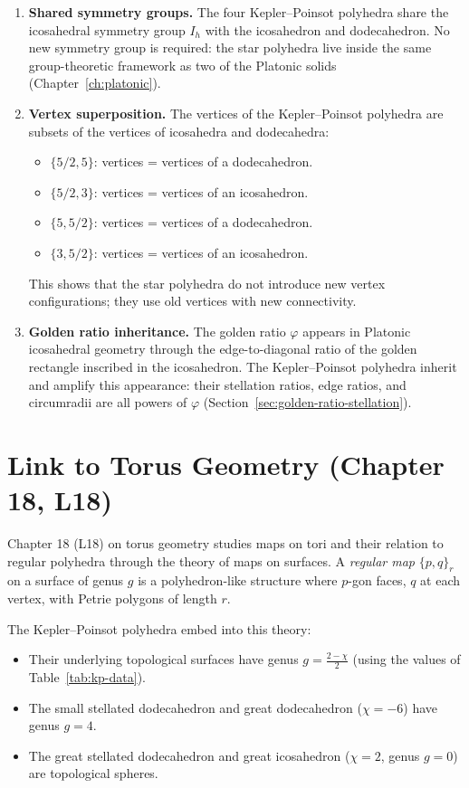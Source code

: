 \begin{enumerate}
\item \textbf{Shared symmetry groups.}  The four Kepler–Poinsot
polyhedra share the icosahedral symmetry group $I_h$ with the
icosahedron and dodecahedron.  No new symmetry group is
required: the star polyhedra live inside the same group-theoretic
framework as two of the Platonic solids
(Chapter~\ref{ch:platonic}).

\item \textbf{Vertex superposition.}  The vertices of the
Kepler–Poinsot polyhedra are subsets of the vertices of
icosahedra and dodecahedra:
  \begin{itemize}
  \item $\{5/2,5\}$: vertices = vertices of a dodecahedron.
  \item $\{5/2,3\}$: vertices = vertices of an icosahedron.
  \item $\{5,5/2\}$: vertices = vertices of a dodecahedron.
  \item $\{3,5/2\}$: vertices = vertices of an icosahedron.
  \end{itemize}
This shows that the star polyhedra do not introduce new vertex
configurations; they use old vertices with new connectivity.

\item \textbf{Golden ratio inheritance.}  The golden ratio
$\varphi$ appears in Platonic icosahedral geometry through
the edge-to-diagonal ratio of the golden rectangle inscribed in
the icosahedron.  The Kepler–Poinsot polyhedra inherit and
amplify this appearance: their stellation ratios, edge ratios,
and circumradii are all powers of $\varphi$
(Section~\ref{sec:golden-ratio-stellation}).
\end{enumerate}

\section{Link to Torus Geometry (Chapter 18, L18)}
\label{sec:link-torus}

Chapter 18 (L18) on torus geometry studies maps on tori and
their relation to regular polyhedra through the theory of maps
on surfaces.  A \emph{regular map} $\{p,q\}_r$ on a surface of
genus $g$ is a polyhedron-like structure where $p$-gon faces,
$q$ at each vertex, with Petrie polygons of length $r$.

The Kepler–Poinsot polyhedra embed into this theory:
\begin{itemize}
  \item Their underlying topological surfaces have genus
        $g = \frac{2-\chi}{2}$ (using the values of
        Table~\ref{tab:kp-data}).
  \item The small stellated dodecahedron and great dodecahedron
        ($\chi = -6$) have genus $g=4$.
  \item The great stellated dodecahedron and great icosahedron
        ($\chi = 2$, genus $g=0$) are topological spheres.
\end{itemize}

